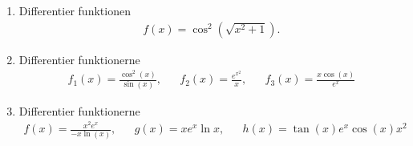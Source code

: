 \begin{enumerate}
	\item Differentier funktionen
	\begin{align*}
	f(x)=\cos^2(\sqrt{x^2+1}).
	\end{align*}
		
	\item Differentier funktionerne
	\begin{align*}
	f_1(x)=\frac{\cos^2(x)}{\sin(x)},&&f_2(x)=\frac{e^{x^2}}{x},&&f_3(x)= \frac{x\cos(x)}{e^x}
	\end{align*}
	
	
	
	\item Differentier funktionerne
	\begin{align*}
	f(x)=\frac{x^2e^x}{-x\ln(x)},&& g(x)=xe^x\ln x,&& h(x)=\tan(x)e^{x}\cos(x)x^2
	\end{align*}
	
	
\end{enumerate}